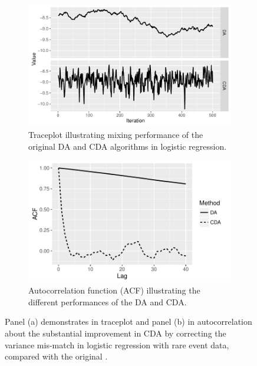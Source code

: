\documentclass[10pt]{article}
\begin{document}
\begin{figure}[H]
  \begin{subfigure}[b]{0.49\textwidth}
 \includegraphics[width=1\textwidth]{logit_random_trace_plot.pdf}
  \caption{Traceplot illustrating mixing performance of the original DA and CDA algorithms in logistic regression.}
\end{subfigure}
  \hfill
   \begin{subfigure}[b]{0.49\textwidth}
 \includegraphics[width=1\textwidth]{logit_random_acf.pdf}
  \caption{Autocorrelation function (ACF) illustrating the different performances of the DA and CDA.}
\end{subfigure}
 \caption{Panel (a) demonstrates in traceplot and panel (b) in autocorrelation about the substantial improvement in CDA by correcting the variance mis-match in logistic regression with rare event data, compared with the original \citep{polson2013bayesian}.}
    \label{logit_random_mixing}
 \end{figure}
\end{document}
